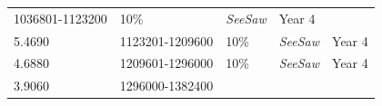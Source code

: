 \documentclass[11pt,a4paperpaper,]{report}
\begin{document}
\begin{longtable}[]{@{}llllc@{}}
\begin{minipage}[t]{0.19\columnwidth}
1036801-1123200\strut
\end{minipage} & \begin{minipage}[t]{0.14\columnwidth}\raggedright\strut
10\%\strut
\end{minipage} & \begin{minipage}[t]{0.25\columnwidth}\raggedright\strut
\textit{SeeSaw}\strut
\end{minipage} & \begin{minipage}[t]{0.12\columnwidth}\centering\strut
Year 4\strut
\end{minipage}\tabularnewline
\begin{minipage}[t]{0.12\columnwidth}\raggedright\strut
5.4690\strut
\end{minipage} & \begin{minipage}[t]{0.19\columnwidth}\raggedright\strut
1123201-1209600\strut
\end{minipage} & \begin{minipage}[t]{0.14\columnwidth}\raggedright\strut
10\%\strut
\end{minipage} & \begin{minipage}[t]{0.25\columnwidth}\raggedright\strut
\textit{SeeSaw}\strut
\end{minipage} & \begin{minipage}[t]{0.12\columnwidth}\centering\strut
Year 4\strut
\end{minipage}\tabularnewline
\begin{minipage}[t]{0.12\columnwidth}\raggedright\strut
4.6880\strut
\end{minipage} & \begin{minipage}[t]{0.19\columnwidth}\raggedright\strut
1209601-1296000\strut
\end{minipage} & \begin{minipage}[t]{0.14\columnwidth}\raggedright\strut
10\%\strut
\end{minipage} & \begin{minipage}[t]{0.25\columnwidth}\raggedright\strut
\textit{SeeSaw}\strut
\end{minipage} & \begin{minipage}[t]{0.12\columnwidth}\centering\strut
Year 4\strut
\end{minipage}\tabularnewline
\begin{minipage}[t]{0.12\columnwidth}\raggedright\strut
3.9060\strut
\end{minipage} & \begin{minipage}[t]{0.19\columnwidth}\raggedright\strut
1296000-1382400\strut
\end{minipage} & \begin{minipage}[t]{0.14\columnwidth}\raggedright\strut

\end{minipage}
\end{longtable}
\end{document}
